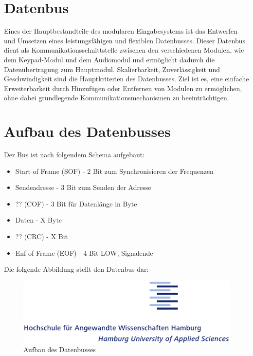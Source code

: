 \section{Datenbus}
Eines der Hauptbestandteile des modularen Eingabesystems ist das Entwerfen und Umsetzen eines leistungsfähigen und flexiblen Datenbusses. Dieser Datenbus dient als Kommunikationsschnittstelle zwischen den verschiedenen Modulen, wie dem Keypad-Modul und dem Audiomodul und ermöglicht dadurch die Datenübertragung zum Hauptmodul. Skalierbarkeit, Zuverlässigkeit und Geschwindigkeit sind die Hauptkriterien des Datenbusses. Ziel ist es, eine einfache Erweiterbarkeit durch Hinzufügen oder Entfernen von Modulen zu ermöglichen, ohne dabei grundlegende Kommunikationsmechanismen zu beeinträchtigen.

\section{Aufbau des Datenbusses}
Der Bus ist nach folgendem Schema aufgebaut:
\begin{itemize}
    \item Start of Frame (SOF) - 2 Bit zum Synchronisieren der Frequenzen
    \item Sendeadresse -  3 Bit zum Senden der Adresse
    \item ?? (COF) - 3 Bit für Datenlänge in Byte
    \item Daten - X Byte
    \item ?? (CRC) - X Bit
    \item Enf of Frame (EOF) - 4 Bit LOW, Signalende
\end{itemize}

Die folgende Abbildung stellt den Datenbus dar:
\begin{figure}[H]
    \centering    
    \includegraphics[width=1\textwidth]{logo/HAW_logo.eps}
    \caption{Aufbau des Datenbusses}
    \label{Datenbus}
\end{figure}
